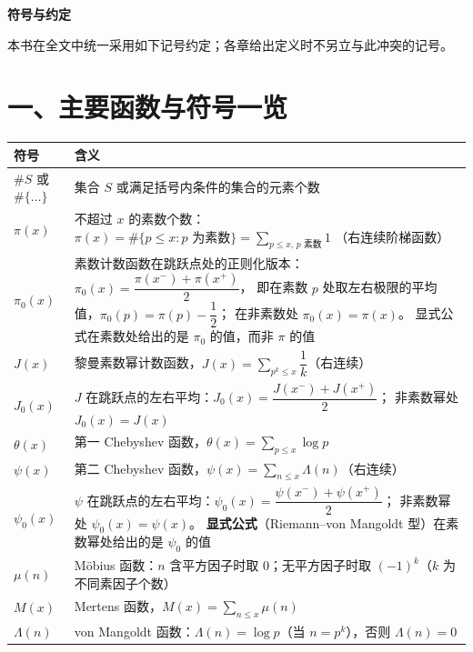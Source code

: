 
\begin{center}
  {\bfseries\Large 符号与约定}
\end{center}

\bigskip\noindent
本书在全文中统一采用如下记号约定；各章给出定义时不另立与此冲突的记号。

\section*{一、主要函数与符号一览}

\renewcommand{\arraystretch}{1.7}
\begin{longtable}{@{}lp{10cm}@{}}
\toprule
\textbf{符号} & \textbf{含义} \\
\midrule
$\# S$ 或 $\#\{\dots\}$
  & 集合 $S$ 或满足括号内条件的集合的元素个数 \\
$\pi(x)$
  & 不超过 $x$ 的素数个数：
    $\pi(x) = \#\{p \le x : p \text{ 为素数}\}
    =\displaystyle\sum_{p\le x,\,p\text{ 素数}}1$
    （右连续阶梯函数） \\
$\pi_0(x)$
  & 素数计数函数在跳跃点处的正则化版本：
    $\pi_0(x)=\dfrac{\pi(x^-)+\pi(x^+)}{2}$，
    即在素数 $p$ 处取左右极限的平均值，$\pi_0(p)=\pi(p)-\dfrac{1}{2}$；
    在非素数处 $\pi_0(x)=\pi(x)$。
    显式公式在素数处给出的是 $\pi_0$ 的值，而非 $\pi$ 的值 \\
$J(x)$
  & 黎曼素数幂计数函数，$J(x)=\displaystyle\sum_{p^k\le x}\dfrac{1}{k}$（右连续） \\
$J_0(x)$
  & $J$ 在跳跃点的左右平均：$J_0(x)=\dfrac{J(x^-)+J(x^+)}{2}$；
    非素数幂处 $J_0(x)=J(x)$ \\
$\theta(x)$
  & 第一 Chebyshev 函数，$\theta(x)=\displaystyle\sum_{p\le x}\log p$ \\
$\psi(x)$
  & 第二 Chebyshev 函数，$\psi(x)=\displaystyle\sum_{n\le x}\Lambda(n)$（右连续） \\
$\psi_0(x)$
  & $\psi$ 在跳跃点的左右平均：$\psi_0(x)=\dfrac{\psi(x^-)+\psi(x^+)}{2}$；
    非素数幂处 $\psi_0(x)=\psi(x)$。
    \textbf{显式公式}（Riemann--von Mangoldt 型）在素数幂处给出的是 $\psi_0$ 的值 \\
$\mu(n)$
  & Möbius 函数：$n$ 含平方因子时取 $0$；无平方因子时取 $(-1)^k$（$k$ 为不同素因子个数） \\
$M(x)$
  & Mertens 函数，$M(x)=\displaystyle\sum_{n\le x}\mu(n)$ \\
$\Lambda(n)$
  & von Mangoldt 函数：$\Lambda(n)=\log p$（当 $n=p^k$），否则 $\Lambda(n)=0$ \\

\end{longtable}
